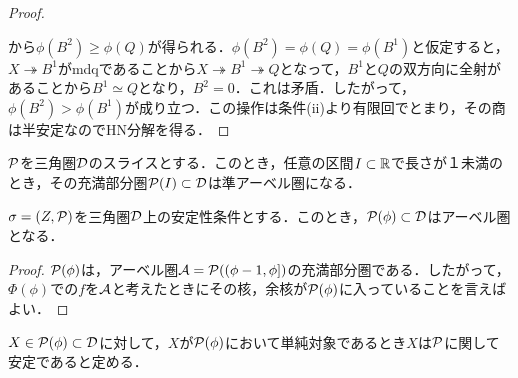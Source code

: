 \begin{proof}
\begin{center}
\end{center}
から$\phi(B^2)\ge\phi(Q)$が得られる．$\phi(B^2)=\phi(Q)=\phi(B^1)$と仮定すると，$X\twoheadrightarrow B^1$がmdqであることから$X\twoheadrightarrow B^1\twoheadrightarrow Q$となって，$B^1$と$Q$の双方向に全射があることから$B^1\simeq Q$となり，$B^2=0$．これは矛盾．したがって，$\phi(B^2)>\phi(B^1)$が成り立つ．この操作は条件(ii)より有限回でとまり，その商は半安定なのでHN分解を得る．
\end{proof}

\begin{prop}
	$\P$を三角圏$\D$のスライスとする．このとき，任意の区間$I\subset\RR$で長さが１未満のとき，その充満部分圏$\P(I)\subset\D$は準アーベル圏になる．
\end{prop}

\begin{prop}\cite{Bri07}
	$\sigma = (Z,\P)$を三角圏$\D$上の安定性条件とする．このとき，$\P(\phi)\subset\D$はアーベル圏となる．
\end{prop}
\begin{proof}
$\P(\phi)$は，アーベル圏$\A=\P((\phi-1,\phi])$の充満部分圏である．したがって，$\Phi(\phi)$での$f$を$\A$と考えたときにその核，余核が$\P(\phi)$に入っていることを言えばよい．
\end{proof}

\begin{defn}
	$X\in\P(\phi)\subset\D$に対して，$X$が$\P(\phi)$において単純対象であるとき$X$は$\P$に関して安定であると定める．
\end{defn}
